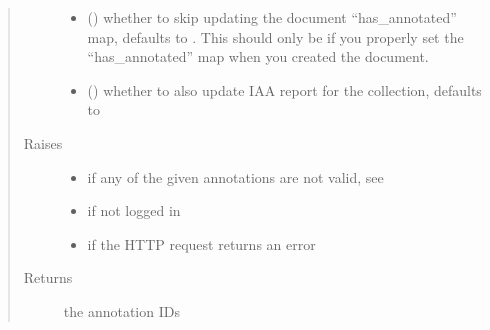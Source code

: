 \documentclass[letterpaper,10pt,english]{sphinxmanual}
\begin{document}
\begin{fulllineitems}
\begin{fulllineitems}
\begin{quote}
\begin{description}
\begin{itemize}
\item {} 
\sphinxAtStartPar
{} () \textendash{} whether to skip updating the document “has\_annotated” map, defaults to .
This should only be  if you properly set the
“has\_annotated” map when you created the document.

\item {} 
\sphinxAtStartPar
{} () \textendash{} whether to also update IAA report for the collection, defaults to 

\end{itemize}

\item[{Raises}] \leavevmode\begin{itemize}
\item {} 
\sphinxAtStartPar
{\hyperref[\detokenize{autoapi/pine/client/exceptions/index:pine.client.exceptions.PineClientValueException}]{}} \textendash{} if any of the given annotations are not valid, see {\hyperref[\detokenize{autoapi/pine/client/models/index:pine.client.models.is_valid_doc_annotations}]{}}

\item {} 
\sphinxAtStartPar
{\hyperref[\detokenize{autoapi/pine/client/exceptions/index:pine.client.exceptions.PineClientAuthException}]{}} \textendash{} if not logged in

\item {} 
\sphinxAtStartPar
{\hyperref[\detokenize{autoapi/pine/client/exceptions/index:pine.client.exceptions.PineClientHttpException}]{}} \textendash{} if the HTTP request returns an error

\end{itemize}

\item[{Returns}] \leavevmode
\sphinxAtStartPar
the annotation IDs


\end{description}
\end{quote}
\end{fulllineitems}
\end{fulllineitems}
\end{document}
